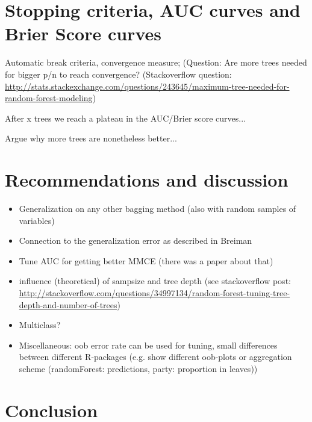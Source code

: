 \documentclass[paper=a4
               ,12pt
               ,DIV=12
               ,parskip=half
               ,titlepage=on
               ,headinclude 
               ,footinclude
               ,headsepline
               ,footsepline         %
               ,ilines 
               ]{scrartcl}
\begin{document}
\section{Stopping criteria, AUC curves and Brier Score curves}
Automatic break criteria, convergence measure; (Question: Are more trees needed for bigger p/n to reach convergence? (Stackoverflow question: \url{http://stats.stackexchange.com/questions/243645/maximum-tree-needed-for-random-forest-modeling})

After x trees we reach a plateau in the AUC/Brier score curves...

Argue why more trees are nonetheless better...

\section{Recommendations and discussion}
\label{sec:discussion}

\begin{itemize}
 \item Generalization on any other bagging method (also with random samples of variables)
 \item Connection to the generalization error as described in Breiman
 \item Tune AUC for getting better MMCE (there was a paper about that)
 \item influence (theoretical) of sampsize and tree depth (see stackoverflow post: \url{http://stackoverflow.com/questions/34997134/random-forest-tuning-tree-depth-and-number-of-trees})
 \item Multiclass?
 \item Miscellaneous: oob error rate can be used for tuning, small differences between different R-packages (e.g. show different oob-plots or aggregation scheme (randomForest: predictions, party: proportion in leaves))
\end{itemize}

\section{Conclusion}


\end{document}
